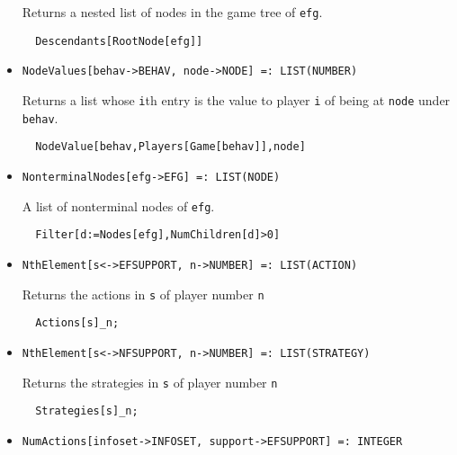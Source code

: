 \begin{itemize}
\bd 
Returns a nested list of nodes in the game tree of \verb+efg+.  
\begin{verbatim}
  Descendants[RootNode[efg]]
\end{verbatim} 
\ed

\item{}
\protect \large \begin{verbatim}
NodeValues[behav->BEHAV, node->NODE] =: LIST(NUMBER) 
\end{verbatim}\normalsize

\bd 
Returns a list whose \verb+i+th entry is the value to player \verb+i+
of being at \verb+node+ under \verb+behav+.
\begin{verbatim}
  NodeValue[behav,Players[Game[behav]],node]
\end{verbatim} 
\ed

\item{}
\protect \large \begin{verbatim}
NonterminalNodes[efg->EFG] =: LIST(NODE) 
\end{verbatim}\normalsize

\bd 
A list of nonterminal nodes of \verb+efg+.
\begin{verbatim}
  Filter[d:=Nodes[efg],NumChildren[d]>0]
\end{verbatim} 
\ed

\item{}
\protect \large \begin{verbatim}
NthElement[s<->EFSUPPORT, n->NUMBER] =: LIST(ACTION) 
\end{verbatim}\normalsize

\bd 
Returns the actions in \verb+s+ of player number \verb+n+
\begin{verbatim}
  Actions[s]_n;
\end{verbatim} 
\ed

\item{}
\protect \large \begin{verbatim}
NthElement[s<->NFSUPPORT, n->NUMBER] =: LIST(STRATEGY) 
\end{verbatim}\normalsize

\bd 
Returns the strategies in \verb+s+ of player number \verb+n+
\begin{verbatim}
  Strategies[s]_n;
\end{verbatim} 
\ed

\item{}
\protect \large \begin{verbatim}
NumActions[infoset->INFOSET, support->EFSUPPORT] =: INTEGER 
\end{verbatim}\normalsize


\end{itemize}
